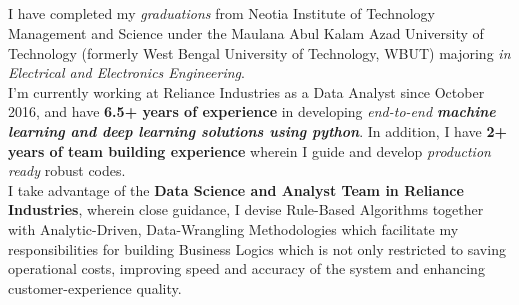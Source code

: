 \documentclass[10pt, a4paper]{article}
\begin{document}
	\begin{center}
		\textcolor{dBlue}{{\HeaderNFont \AuthorFName}\hspace{0.7cm}{\HeaderNFont \AuthorLName}} \\
		\vspace{2pt}
		{\small \textcolor{dBlue}{\CyberPresence}}
		\vspace{-23pt}
	\end{center}

	\textcolor{dBlue}{
		\\ \noindent\makebox[\linewidth]{\rule{\textwidth}{2.1pt}}
		\vspace{-21pt} \\
		\noindent\makebox[\linewidth]{\rule{\paperwidth}{3.9pt}}
		\vspace{-13pt} \\
	}



	I have completed my \textit{graduations} from Neotia Institute of Technology Management and Science under the Maulana Abul Kalam Azad University of Technology (formerly West Bengal University of Technology, WBUT) majoring \textit{in Electrical and Electronics Engineering}. \\[3pt]

	I'm currently working at Reliance Industries as a Data Analyst since October 2016, and have \textbf{6.5+ years of experience} in developing \textit{end-to-end \textbf{machine learning and deep learning solutions using python}}. In addition, I have \textbf{2+ years of team building experience} wherein I guide and develop \textit{production ready} robust codes. \\[3pt]

	I take advantage of the \textbf{Data Science and Analyst Team in Reliance Industries}, wherein close guidance, I devise Rule-Based Algorithms together with Analytic-Driven, Data-Wrangling Methodologies which facilitate my responsibilities for building Business Logics which is not only restricted to saving operational costs, improving speed and accuracy of the system and enhancing customer-experience quality. \\[3pt]
\end{document}
